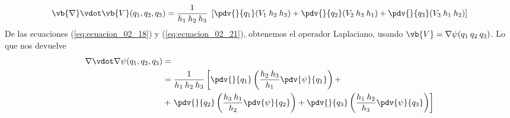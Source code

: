 \begin{equation}
\vb{\nabla} \vdot \vb{V}(q_{1}, q_{2}, q_{3}) = \dfrac{1}{h_{1} \: h_{2} \: h_{3}} \; \left[ \pdv{}{q_{1}} (V_{1} \: h_{2} \: h_{3}) + \pdv{}{q_{2}} (V_{2} \: h_{3} \: h_{1}) + \pdv{}{q_{3}} (V_{3} \: h_{1} \: h_{2})   \right]
\label{eq:ecuacion_02_21}
\end{equation}
De las ecuaciones (\ref{eq:ecuacion_02_18}) y (\ref{eq:ecuacion_02_21}), obtenemos el operador Laplaciano, usando $\vb{V} = \nabla \psi(q_{1} \: q_{2}\:  q_{3})$. Lo que nos devuelve
\begin{align}
\begin{aligned}
\nabla \vdot \nabla \psi (q_{1}, q_{2}, q_{3}) &= \\
&= \dfrac{1}{h_{1} \: h_{2} \: h_{3}} \left[ \pdv{}{q_{1}} \left( \dfrac{h_{2} \: h_{3}}{h_{1}} \pdv{\psi}{q_{1}} \right) + \right. \\
&+ \left.  \pdv{}{q_{2}} \left( \dfrac{h_{3} \: h_{1}}{h_{2}} \pdv{ \psi}{q_{2}} \right) + \pdv{}{q_{3}} \left( \dfrac{h_{1} \: h_{2}}{h_{3}} \pdv{\psi}{q_{3}} \right) \right]  
\end{aligned}
\label{eq:ecuacion_02_22}
\end{align}

